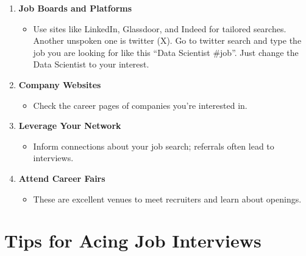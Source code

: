 \documentclass[
  letterpaper,
  DIV=11,
  numbers=noendperiod]{scrreprt}
\providecommand{\tightlist}{%
  \setlength{\itemsep}{0pt}\setlength{\parskip}{0pt}}\usepackage{longtable,booktabs,array}
\begin{document}
\begin{enumerate}
\def\labelenumi{\arabic{enumi}.}
\item
  \textbf{Job Boards and Platforms}

  \begin{itemize}
  \tightlist
  \item
    Use sites like LinkedIn, Glassdoor, and Indeed for tailored
    searches. Another unspoken one is twitter (X). Go to twitter search
    and type the job you are looking for like this ``Data Scientist
    \#job''. Just change the Data Scientist to your interest.
  \end{itemize}
\item
  \textbf{Company Websites}

  \begin{itemize}
  \tightlist
  \item
    Check the career pages of companies you're interested in.
  \end{itemize}
\item
  \textbf{Leverage Your Network}

  \begin{itemize}
  \tightlist
  \item
    Inform connections about your job search; referrals often lead to
    interviews.
  \end{itemize}
\item
  \textbf{Attend Career Fairs}

  \begin{itemize}
  \tightlist
  \item
    These are excellent venues to meet recruiters and learn about
    openings.
  \end{itemize}
\end{enumerate}

\section{Tips for Acing Job
Interviews}\label{tips-for-acing-job-interviews}
\end{document}
